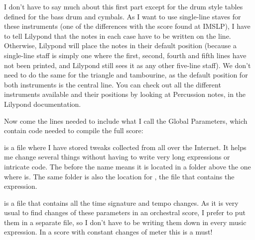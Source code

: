 \documentclass[../../LilyPond-Tutorials]{subfiles}
\begin{document}
I don't have to say much about this first part except for the drum style tables defined for the bass drum and cymbals.
As I want to use single-line staves for these instruments (one of the differences with the score found at IMSLP), I have to tell Lilypond that the notes in each case have to be written on the line.
Otherwise, Lilypond will place the notes in their default position (because a single-line staff is simply one where the first, second, fourth and fifth lines have not been printed, and Lilypond still sees it as any other five-line staff).
We don't need to do the same for the triangle and tambourine, as the default position for both instruments is the central line.
You can check out all the different instruments available and their positions by looking at Percussion notes, in the Lilypond documentation.


Now come the lines needed to include what I call the Global Parameters, which contain code needed to compile the full score:

\begin{lilypondcode}




\end{lilypondcode}

 is a file where I have stored tweaks collected from all over the Internet.
It helps me change several things without having to write very long expressions or intricate code.
The  before the name means it is located in a folder above the one where  is.
The same folder is also the location for , the file that contains the  expression. 

 is a file that contains all the time signature and tempo changes.
As it is very usual to find changes of these parameters in an orchestral score, I prefer to put them in a separate file, so I don't have to be writing them down in every music expression.
In a score with constant changes of meter this is a must!
\end{document}
